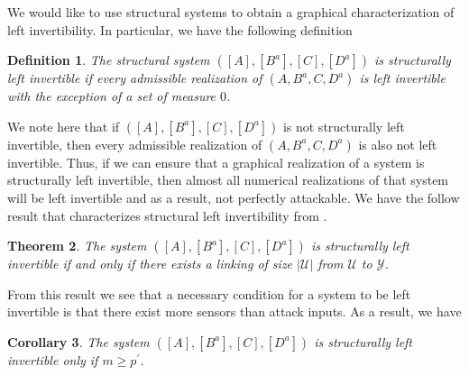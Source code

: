 \documentclass[letterpaper, 10 pt, conference]{ieeeconf}
\newtheorem{theorem}{Theorem}
\newtheorem{corollary}[theorem]{Corollary}
\newtheorem{definition}[theorem]{Definition}
\begin{document}
We would like to use structural systems to obtain a graphical characterization of left invertibility. In particular, we have the following definition
\begin{definition}
The structural system $([A], [B^a], [C], [D^a])$ is structurally left invertible if every admissible realization of $(A,B^a,C,D^a)$ is left invertible with the exception of a set of measure $0$.
\end{definition}
We note here that if $([A], [B^a], [C], [D^a])$ is not structurally left invertible, then every admissible realization of $(A,B^a,C,D^a)$ is also not left invertible. Thus, if we can ensure that a graphical realization of a system is structurally left invertible, then almost all numerical realizations of that system will be left invertible and as a result, not perfectly attackable. We have the follow result that characterizes structural left invertibility from \cite{PasqualettiAttack}.
\begin{theorem}
The system $([A],[B^a],[C],[D^a])$ is structurally left invertible if and only if there exists a linking of size $|\mathcal{U}|$ from $\mathcal{U}$ to $\mathcal{Y}$.
\end{theorem}
From this result we see that a necessary condition for a system to be left invertible is that there exist more sensors than attack inputs. As a result, we have
\begin{corollary}
The system $([A],[B^a],[C],[D^a])$ is structurally left invertible only if $m \ge p^\prime$.
\end{corollary}
\end{document}
